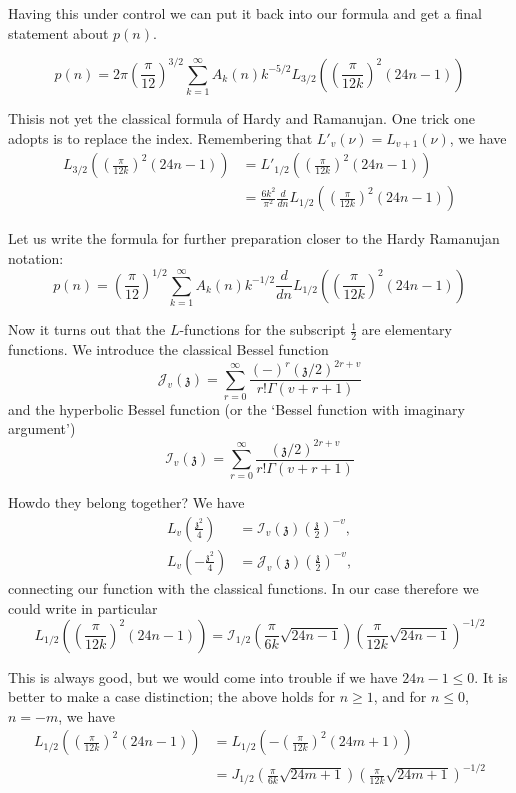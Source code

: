 Having this under control we can put it back into our formula and get
a final statement about $p(n)$.

$$
p(n) = 2 \pi \left( \frac{\pi}{12}\right)^{3/2} \sum^\infty_{k=1} A_k
(n) k^{- 5/2} L_{3/2} \left( \left( \frac{\pi}{12k}\right)^2(24n-1) \right) 
$$

This\pageoriginale is not yet the classical formula of Hardy and
Ramanujan. One trick one adopts is to replace the index. Remembering
that $L'_v (\nu) = L_{v+1} (\nu)$, we have
\begin{align*}
  L_{3/2} \left(\left( \frac{\pi}{12k}\right)^2 (24n-1) \right) & =
  L'_{1/2} \left( \left( \frac{\pi}{12k}\right)^2 (24n-1)\right)\\
  & = \frac{6k^2}{\pi^2} \frac{d}{dn} L_{1/2} \left( \left(
  \frac{\pi}{12k}\right)^2 (24n-1)\right)
\end{align*}

Let us write the formula for further preparation closer to the Hardy
Ramanujan notation:
$$
p(n) = \left( \frac{\pi}{12}\right)^{1/2} \sum^\infty_{k=1} A_k (n)
k^{-1/2} \frac{d}{dn} L_{1/2} \left( \left( \frac{\pi}{12k}\right)^2
(24n-1)\right) 
$$

Now it turns out that the $L$-functions for the subscript
$\frac{1}{2}$ are elementary functions. We introduce the classical
Bessel function
$$
\mathcal{J}_v (\mathfrak{z}) = \sum^\infty_{r=0} \frac{(-)^r
  (\mathfrak{z}/2)^{2r+v}}{r! \Gamma (v +r+1)}
$$
and the hyperbolic Bessel function (or the `Bessel function with
imaginary argument')
$$
\mathcal{I}_v (\mathfrak{z}) = \sum^\infty_{r=0}
\frac{(\mathfrak{z}/2)^{2r+v}}{r! \Gamma (v+r+1)}
$$

How\pageoriginale do they belong together? We have
\begin{align*}
  L_v \left( \frac{\mathfrak{z}^2}{4}\right) & = \mathcal{I}_v
  (\mathfrak{z}) \left(\frac{\mathfrak{z}}{2} \right)^{-v},\\
  L_v \left( -\frac{\mathfrak{z}^2}{4}\right) & = \mathcal{J}_v
  (\mathfrak{z}) \left(\frac{\mathfrak{z}}{2} \right)^{-v},  
\end{align*}
connecting our function with the classical functions. In our case
therefore we could write in particular
$$
L_{1/2} \left( \left(\frac{\pi}{12 k}\right)^2 (24n-1)\right)=
\mathcal{I}_{1/2} \left(\frac{\pi}{6k}\sqrt{24n-1}\right) \left(
\frac{\pi}{12k} \sqrt{24 n-1}\right)^{-1/2}
$$

This is always good, but we would come into trouble if we have
$24n-1\leq 0$. It is better to make a case distinction; the above
holds for $n \geq 1$, and for $n \leq 0$, $n=- m$, we have
\begin{align*}
  L_{1/2} \left( \left( \frac{\pi}{12k}\right)^2(24n-1)\right) & =
  L_{1/2} \left(- \left(\frac{\pi}{12k} \right)^2(24m+1)\right)\\
  & = J_{1/2} \left( \frac{\pi}{6k} \sqrt{24 m+1}\right)
  \left( \frac{\pi}{12k} \sqrt{24m+1}\right)^{-1/2} 
\end{align*}

